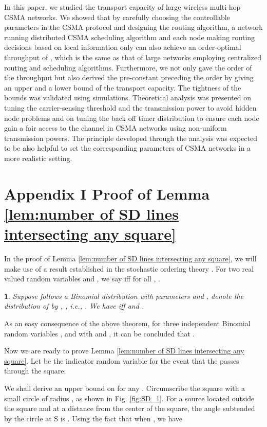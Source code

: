 \documentclass[english]{IEEEtran}
\theoremstyle{plain}
\newtheorem{thm}{\protect\theoremname}
\theoremstyle{plain}
\theoremstyle{plain}
\theoremstyle{remark}
\providecommand{\theoremname}{Theorem}
\begin{document}
In this paper, we studied the transport capacity of large wireless
multi-hop CSMA networks. We showed that by carefully choosing the
controllable parameters in the CSMA protocol and designing the routing
algorithm, a network running distributed CSMA scheduling algorithm
and each node making routing decisions based on local information
only can also achieve an order-optimal throughput of ,
which is the same as that of large networks employing centralized
routing and scheduling algorithms. Furthermore, we not only gave the
order of the throughput but also derived the pre-constant preceding
the order by giving an upper and a lower bound of the transport capacity.
The tightness of the bounds was validated using simulations. Theoretical
analysis was presented on tuning the carrier-sensing threshold and
the transmission power to avoid hidden node problems and on tuning
the back off timer distribution to ensure each node gain a fair access
to the channel in CSMA networks using non-uniform transmission powers.
The principle developed through the analysis was expected to be also
helpful to set the corresponding parameters of CSMA networks in a
more realistic setting.


\section*{Appendix I Proof of Lemma \ref{lem:number of SD lines intersecting any square}}

In the proof of Lemma \ref{lem:number of SD lines intersecting any square},
we will make use of a result established in the stochastic ordering
theory \cite{Klenke10Stochastic}. For two real valued random variables
 and , we say  iff for all ,
. 
\begin{thm}
\label{thm:Stochastic Ordering}\cite[Theorem 1(a)]{Klenke10Stochastic}Suppose
 follows a Binomial distribution with parameters 
and , denote the distribution of 
by , , i.e., .
We have  iff 
and . 
\end{thm}
As an easy consequence of the above theorem, for three independent
Binomial random variables ,
 and 
with  and , it can be concluded
that . 

Now we are ready to prove Lemma \ref{lem:number of SD lines intersecting any square}.
Let  be the indicator random variable for the event that
the  passes through the  square:

We shall derive an upper bound on  for
any . Circumscribe the
 square with a small circle of radius ,
as shown in Fig. \ref{fig:SD_1}. For a source  located outside
the square and at a distance  from the center of the square, the
angle  subtended by the circle at S is .
Using the fact that  when , we
have 
\end{document}
